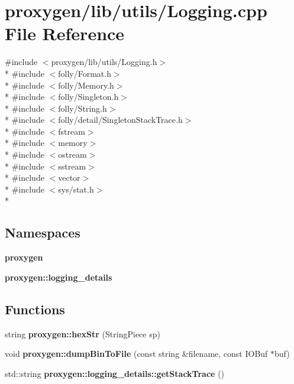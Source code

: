 \section{proxygen/lib/utils/\+Logging.cpp File Reference}
\label{utils_2Logging_8cpp}
{\ttfamily \#include $<$proxygen/lib/utils/\+Logging.\+h$>$}\\*
{\ttfamily \#include $<$folly/\+Format.\+h$>$}\\*
{\ttfamily \#include $<$folly/\+Memory.\+h$>$}\\*
{\ttfamily \#include $<$folly/\+Singleton.\+h$>$}\\*
{\ttfamily \#include $<$folly/\+String.\+h$>$}\\*
{\ttfamily \#include $<$folly/detail/\+Singleton\+Stack\+Trace.\+h$>$}\\*
{\ttfamily \#include $<$fstream$>$}\\*
{\ttfamily \#include $<$memory$>$}\\*
{\ttfamily \#include $<$ostream$>$}\\*
{\ttfamily \#include $<$sstream$>$}\\*
{\ttfamily \#include $<$vector$>$}\\*
{\ttfamily \#include $<$sys/stat.\+h$>$}\\*
\subsection*{Namespaces}
\begin{DoxyCompactItemize}
\item 
 {\bf proxygen}
\item 
 {\bf proxygen\+::logging\+\_\+details}
\end{DoxyCompactItemize}
\subsection*{Functions}
\begin{DoxyCompactItemize}
\item 
string {\bf proxygen\+::hex\+Str} (String\+Piece sp)
\item 
void {\bf proxygen\+::dump\+Bin\+To\+File} (const string \&filename, const I\+O\+Buf $\ast$buf)
\item 
std\+::string {\bf proxygen\+::logging\+\_\+details\+::get\+Stack\+Trace} ()
\end{DoxyCompactItemize}
